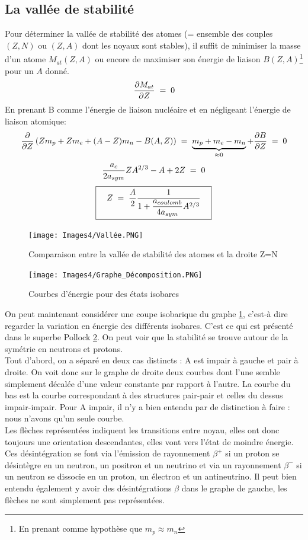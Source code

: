 \subsection{La vallée de stabilité}


Pour déterminer la vallée de stabilité des atomes (= ensemble des couples $(Z,N)$ ou $(Z,A)$ dont les noyaux sont stables), il suffit de minimiser la masse d'un atome $M_{at}(Z,A)$ ou encore de maximiser son énergie de liaison $B(Z,A)$\footnote{En prenant comme hypothèse que $m_p \approx m_n$} pour un $A$ donné.
\[
    \dfrac{\partial M_{at}}{\partial Z} \; = \; 0
\]
En prenant B comme l'énergie de liaison nucléaire et en négligeant l'énergie de liaison atomique:
\[
    \dfrac{\partial}{\partial Z}\left(Zm_p + Zm_e + (A-Z)m_n -B(A,Z)\right) 
    \; = \; \underbrace{m_p + m_e - m_n}_{\approx 0} + \dfrac{\partial B}{\partial Z}
    \; = \; 0
\]
\[
    \dfrac{a_c}{2a_{sym}}Z A^{2/3} - A + 2Z \; = \; 0
\]
\[
    \boxed{\quad
        Z \; = \; \dfrac{A}{2} \dfrac{1}{1 + \dfrac{a_{coulomb}}{4a_{sym}}A^{2/3}}\quad
    }
\]
\begin{figure}[H]
    \centering
    \texttt{[image: Images4/Vallée.PNG]}
    \caption{Comparaison entre la vallée de stabilité des atomes et la droite Z=N}
    \label{vallee}
\end{figure}
\begin{figure}[H]
    \centering
    \texttt{[image: Images4/Graphe\_Décomposition.PNG]}
    \caption{Courbes d'énergie pour des états isobares}
    \label{decomp_noyau}
\end{figure}
On peut maintenant considérer une coupe isobarique du graphe \ref{vallee}, c'est-à dire regarder la variation en énergie des différents isobares. C'est ce qui est présenté dans le superbe Pollock \ref{decomp_noyau}. On peut voir que la stabilité se trouve autour de la symétrie en neutrons et protons.\\

Tout d'abord, on a séparé en deux cas distincts : A est impair à gauche et pair à droite. On voit donc sur le graphe de droite deux courbes dont l'une semble simplement décalée d'une valeur constante par rapport à l'autre. La courbe du bas est la courbe correspondant à des structures pair-pair et celles du dessus impair-impair. Pour A impair, il n'y a bien entendu par de distinction à faire : nous n'avons qu'un seule courbe.\\

Les flèches représentées indiquent les transitions entre noyau, elles ont donc toujours une orientation descendantes, elles vont vers l'état de moindre énergie. Ces désintégration se font via l'émission de rayonnement $\beta^+$ si un proton se désintègre en un neutron, un positron et un neutrino et via un rayonnement $\beta^-$ si un neutron se dissocie en un proton, un électron et un antineutrino. Il peut bien entendu également y avoir des désintégrations $\beta$ dans le graphe de gauche, les flèches ne sont simplement pas représentées.













